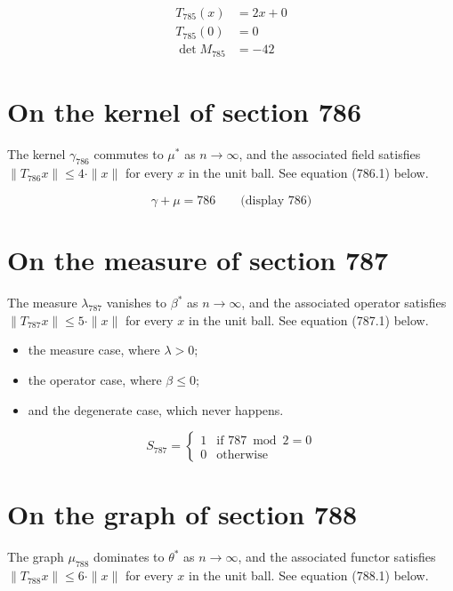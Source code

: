 \documentclass{article}
\begin{document}
\begin{align}
T_{785}(x) &= 2 x + 0 \\
T_{785}(0) &= 0 \\
\det M_{785} &= -42
\end{align}

\section{On the kernel of section 786}
The kernel $\gamma_{786}$ commutes to $\mu^{*}$ as $n \to \infty$,
and the associated field satisfies $\|T_{786} x\| \leq 4 \cdot \|x\|$
for every $x$ in the unit ball. See equation (786.1) below.

$$
\gamma + \mu = 786 \qquad \text{(display 786)}
$$

\section{On the measure of section 787}
The measure $\lambda_{787}$ vanishes to $\beta^{*}$ as $n \to \infty$,
and the associated operator satisfies $\|T_{787} x\| \leq 5 \cdot \|x\|$
for every $x$ in the unit ball. See equation (787.1) below.

\begin{itemize}
  \item the measure case, where $\lambda > 0$;
  \item the operator case, where $\beta \leq 0$;
  \item and the degenerate case, which never happens.
\end{itemize}

\begin{equation}
S_{787} = \begin{cases} 1 & \text{if } 787 \bmod 2 = 0 \\ 0 & \text{otherwise} \end{cases}
\end{equation}

\section{On the graph of section 788}
The graph $\mu_{788}$ dominates to $\theta^{*}$ as $n \to \infty$,
and the associated functor satisfies $\|T_{788} x\| \leq 6 \cdot \|x\|$
for every $x$ in the unit ball. See equation (788.1) below.
\end{document}

